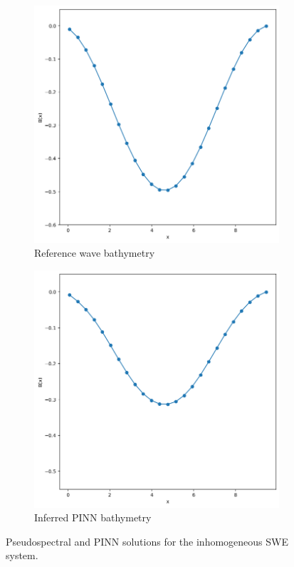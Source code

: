 \begin{figure}[h]
    \centering
    \begin{subfigure}[b]{0.45\textwidth}
        \centering
        \includegraphics[width=\textwidth]{images/inhomogeneous_swe_pseudospectral_bathymetry.png}
        \caption{Reference wave bathymetry}
        \label{fig:inhomogeneous_pseudospectral_swe_bathymetry}
    \end{subfigure}
    \hfill
    \begin{subfigure}[b]{0.45\textwidth}
        \centering
        \includegraphics[width=\textwidth]{images/inhomogeneous_swe_pinn_bathymetry.png}
        \caption{Inferred PINN bathymetry}
        \label{fig:inhomogeneous_pinn_swe_bathymetry}
    \end{subfigure}
    \caption{Pseudospectral and PINN solutions for the inhomogeneous SWE system.}
    \label{fig:inhomogeneous_swe_bathymetry}
\end{figure}